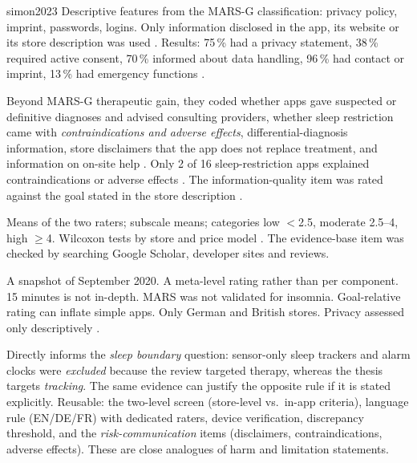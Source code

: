 \begin{papercard}{simon2023}
 Descriptive features from the MARS-G classification: privacy policy, imprint, passwords, logins. Only information disclosed in the app, its website or its store description was used . Results: 75\,\% had a privacy statement, 38\,\% required active consent, 70\,\% informed about data handling, 96\,\% had contact or imprint, 13\,\% had emergency functions .

 Beyond MARS-G therapeutic gain, they coded whether apps gave suspected or definitive diagnoses and advised consulting providers, whether sleep restriction came with \emph{contraindications and adverse effects}, differential-diagnosis information, store disclaimers that the app does not replace treatment, and information on on-site help . Only 2 of 16 sleep-restriction apps explained contraindications or adverse effects . The information-quality item was rated against the goal stated in the store description .

 Means of the two raters; subscale means; categories low $<$2.5, moderate 2.5--4, high $\geq$4. Wilcoxon tests by store and price model . The evidence-base item was checked by searching Google Scholar, developer sites and reviews.

 A snapshot of September 2020. A meta-level rating rather than per component. 15 minutes is not in-depth. MARS was not validated for insomnia. Goal-relative rating can inflate simple apps. Only German and British stores. Privacy assessed only descriptively .

 Directly informs the \emph{sleep boundary} question: sensor-only sleep trackers and alarm clocks were \emph{excluded} because the review targeted therapy, whereas the thesis targets \emph{tracking}. The same evidence can justify the opposite rule if it is stated explicitly. Reusable: the two-level screen (store-level vs.\ in-app criteria), language rule (EN/DE/FR) with dedicated raters, device verification, discrepancy threshold, and the \emph{risk-communication} items (disclaimers, contraindications, adverse effects). These are close analogues of harm and limitation statements.
\end{papercard}
